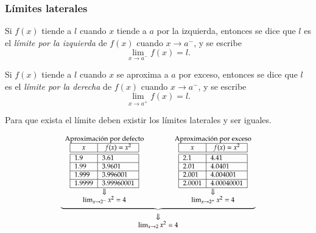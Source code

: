 \begin{frame}
	\frametitle{Límites laterales}
	
	Si $f(x)$ tiende a $l$ cuando $x$ tiende a $a$ por la izquierda, entonces se dice que $l$ es el \emph{límite por la izquierda} de $f(x)$ cuando $x\rightarrow a^-$, y se escribe
	\[\lim_{x\rightarrow a^-}f(x)=l.\]
	
	Si $f(x)$ tiende a $l$ cuando $x$ se aproxima a $a$ por exceso, entonces se dice que $l$ es el \emph{límite por la derecha} de $f(x)$ cuando $x\rightarrow a^-$, y se escribe
	\[\lim_{x\rightarrow a^+}f(x)=l.\]
	
	\begin{center}
		\alert{Para que exista el límite deben existir los límites laterales y ser iguales.}
	\end{center}
	\[
		\footnotesize
		\begin{array}{c}
			\underbrace{\begin{array}{ccc}
			\textrm{Aproximación por defecto} & \qquad & \textrm{Aproximación por exceso} \\
			\begin{array}{|l|l|}
			\hline
			\multicolumn{1}{|c|}{x}      & \multicolumn{1}{c|}{f(x)=x^2}   \\
			\hline\hline
			1.9    & 3.61       \\
			\hline
			1.99   & 3.9601     \\
			\hline
			1.999  & 3.996001   \\
			\hline
			1.9999 & 3.99960001 \\
			\hline
		\end{array}
		& &
		\begin{array}{|l|l|}
			\hline
			\multicolumn{1}{|c|}{x} & \multicolumn{1}{c|}{f(x)=x^2} \\
			\hline\hline
			2.1                     & 4.41                          \\
			\hline
			2.01                    & 4.0401                        \\
			\hline
			2.001                   & 4.004001                      \\
			\hline
			2.0001                  & 4.00040001                    \\
			\hline
		\end{array}\\
		\Downarrow & & \Downarrow\\
		\lim_{x\rightarrow 2^-}x^2=4
		& &
		\lim_{x\rightarrow 2^+}x^2=4
		\end{array}}\\
		\Downarrow\\
		\lim_{x\rightarrow 2}x^2=4
		\end{array}
	\]
\end{frame}



